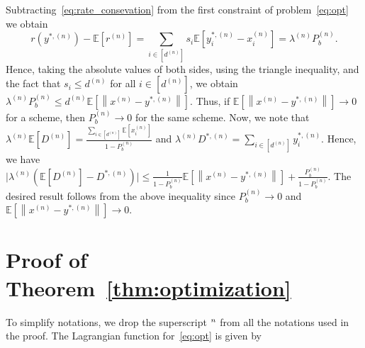 \documentclass[a4paper]{article}
\theoremstyle{plain}
\theoremstyle{definition}
\theoremstyle{case}
\theoremstyle{remark}
\newcommand{\norm}[1]{\left\lVert#1\right\rVert}
\newcommand{\sbrac}[1]{\left[#1\right]}
\newcommand{\expect}[1]{\mathbb{E}\sbrac{#1}}
\newcommand{\abs}[1]{\lvert #1 \rvert}
\begin{document}
Subtracting~\eqref{eq:rate_consevation} from the first constraint of problem~\eqref{eq:opt}
we obtain $$r(y^{*,(n)})-\expect{r^{(n)}}=\sum_{i\in [d^{(n)}]}s_i \expect{y^{*,(n)}_i-x_i^{(n)}}=\lambda^{(n)} P_b^{(n)}.$$
Hence, taking the absolute values of both sides, using the triangle inequality, and the fact that $s_i \leq d^{(n)}$ for all $i \in [d^{(n)}]$, we obtain $\lambda^{(n)} P_b^{(n)} \leq d^{(n)} \expect{\norm{x^{(n)}-y^{*,(n)}}}$.
Thus, if $\expect{\norm{x^{(n)}-y^{*,(n)}}} \to 0$ for a scheme, then $P_b^{(n)}\to 0$ for the same scheme. Now, we note that $\lambda^{(n)}\expect{D^{(n)}}=\frac{\sum_{i \in [d^{(n)}]}\expect{x_i^{(n)}}}{1-P_b^{(n)}}$ and ${\lambda^{(n)}}{D^{*,(n)}}={\sum_{i \in [d^{(n)}]}{y_i^{*,(n)}}}$. 
Hence, we have
$\abs{\lambda^{(n)}(\expect{D^{(n)}}-D^{*,(n)})}\leq \frac{1}{1-P_b^{(n)}}\expect{\norm{x^{(n)}-y^{*,(n)}}}+\frac{P_b^{(n)}}{1-P_b^{(n)}}.$ The desired result follows from the above inequality since  $P_b^{(n)}\to 0$ and $\expect{\norm{x^{(n)}-y^{*,(n)}}} \to 0$.



\section{Proof of Theorem~\ref{thm:optimization}}
\label{proof: optimization proposition}

To simplify notations, we drop the superscript $\vphantom{\cdot}^n$ from all the notations used in the proof. The Lagrangian function for~\eqref{eq:opt} is given by
\end{document}
